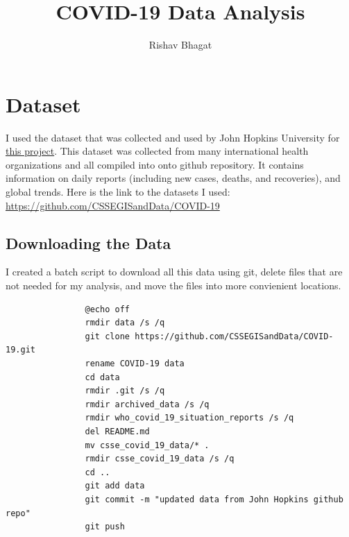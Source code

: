 \documentclass{report}
\title{COVID-19 Data Analysis}
\author{Rishav Bhagat}
\begin{document}
    \maketitle
    \tableofcontents
    \newpage
    \section{Dataset}
        I used the dataset that was collected and used by John Hopkins University for 
        \href{https://www.arcgis.com/apps/opsdashboard/index.html#/bda7594740fd40299423467b48e9ecf6}{this project}. 
        This dataset was collected from many international health organizations and all compiled into onto github repository. 
        It contains information on daily reports (including new cases, deaths, and recoveries), and global trends. 
        \newline \indent
        Here is the link to the datasets I used: 
        \newline\indent\indent \href{https://github.com/CSSEGISandData/COVID-19}{https://github.com/CSSEGISandData/COVID-19}
        \subsection{Downloading the Data}
            I created a batch script to download all this data using git, delete files that are not needed for my analysis, and move the files into more convienient locations.
            \begin{lstlisting}
                @echo off
                rmdir data /s /q
                git clone https://github.com/CSSEGISandData/COVID-19.git
                rename COVID-19 data
                cd data
                rmdir .git /s /q
                rmdir archived_data /s /q
                rmdir who_covid_19_situation_reports /s /q
                del README.md
                mv csse_covid_19_data/* .
                rmdir csse_covid_19_data /s /q
                cd ..
                git add data
                git commit -m "updated data from John Hopkins github repo"
                git push
            \end{lstlisting}
\end{document}
